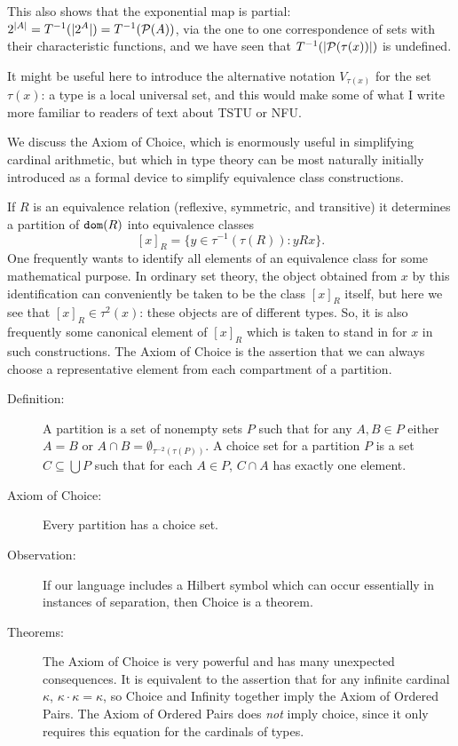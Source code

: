 \documentclass[12pt]{article}
\begin{document}
This also shows that the exponential map is partial:  $2^{|A| }= T^{-1}(|2^A|) = T^{-1}({\cal P}(A))$, via the one to one correspondence of sets with their characteristic functions,
and we have seen that $T^{-1}(|{\cal P}(\tau(x))|)$ is undefined.

It might be useful here to introduce the alternative notation $V_{\tau(x)}$ for the set $\tau(x)$:  a type is a local universal set, and this would make some of what I write more familiar to readers of text about TSTU or NFU.

We discuss the Axiom of Choice, which is enormously useful in simplifying cardinal arithmetic, but which in type theory can be most naturally initially introduced as a formal device to simplify equivalence class constructions.

If $R$ is an equivalence relation (reflexive, symmetric, and transitive) it determines a partition of ${\tt dom}(R)$ into equivalence classes $$[x]_R = \{y \in \tau^{-1}(\tau(R)):yRx\}.$$
One frequently wants to identify all elements of an equivalence class for some mathematical purpose.  In ordinary set theory, the object obtained from $x$ by this identification
can conveniently be taken to be the class $[x]_R$ itself, but here we see that $[x]_R \in \tau^2(x)$:  these objects are of different types.  So, it is also frequently some canonical element of $[x]_R$ which is taken to stand in for $x$ in such constructions.  The Axiom of Choice is the assertion that we can always choose a representative element from each compartment of a partition.

 

\begin{description}

\item[Definition:]  A partition is a set of nonempty sets $P$ such that for any $A,B \in P$ either $A=B$ or $A \cap B = \emptyset_{\tau^{-2}(\tau(P))}$.  A choice set for a partition $P$ is a set $C \subseteq \bigcup P$ such that for each $A \in P$, $C \cap A$ has exactly one element.

\item[Axiom of Choice:]  Every partition has a choice set.

\item[Observation:]  If our language includes a Hilbert symbol which can occur essentially in instances of separation, then Choice is a theorem.

\item[Theorems:]  The Axiom of Choice is very powerful and has many unexpected consequences.  It is equivalent to the assertion that for any infinite cardinal $\kappa$, $\kappa\cdot \kappa = \kappa$, so Choice and Infinity together imply the Axiom of Ordered Pairs.  The Axiom of Ordered Pairs does {\em not\/} imply choice, since it only requires this equation for the cardinals of types.

\end{description}
\end{document}
